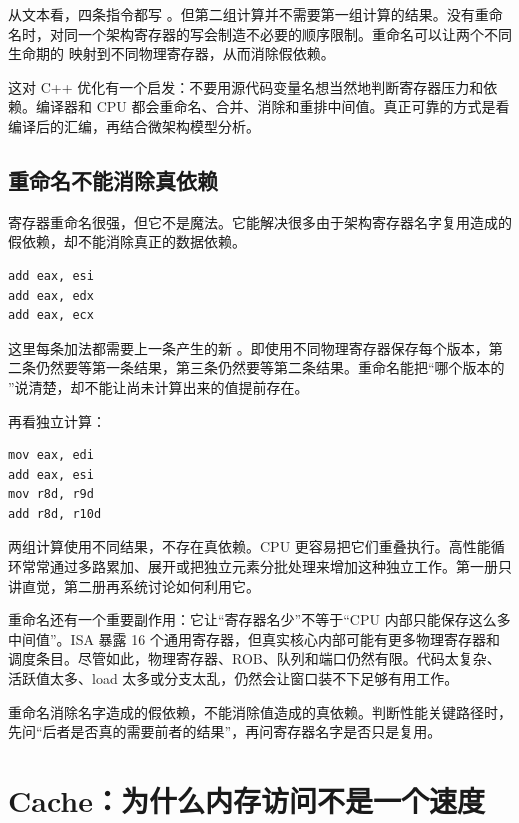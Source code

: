 从文本看，四条指令都写 。但第二组计算并不需要第一组计算的结果。没有重命名时，对同一个架构寄存器的写会制造不必要的顺序限制。重命名可以让两个不同生命期的  映射到不同物理寄存器，从而消除假依赖。

这对 C++ 优化有一个启发：不要用源代码变量名想当然地判断寄存器压力和依赖。编译器和 CPU 都会重命名、合并、消除和重排中间值。真正可靠的方式是看编译后的汇编，再结合微架构模型分析。

\subsection{重命名不能消除真依赖}

寄存器重命名很强，但它不是魔法。它能解决很多由于架构寄存器名字复用造成的假依赖，却不能消除真正的数据依赖。

\begin{lstlisting}
add eax, esi
add eax, edx
add eax, ecx
\end{lstlisting}

这里每条加法都需要上一条产生的新 。即使用不同物理寄存器保存每个版本，第二条仍然要等第一条结果，第三条仍然要等第二条结果。重命名能把“哪个版本的 ”说清楚，却不能让尚未计算出来的值提前存在。

再看独立计算：

\begin{lstlisting}
mov eax, edi
add eax, esi
mov r8d, r9d
add r8d, r10d
\end{lstlisting}

两组计算使用不同结果，不存在真依赖。CPU 更容易把它们重叠执行。高性能循环常常通过多路累加、展开或把独立元素分批处理来增加这种独立工作。第一册只讲直觉，第二册再系统讨论如何利用它。

重命名还有一个重要副作用：它让“寄存器名少”不等于“CPU 内部只能保存这么多中间值”。ISA 暴露 16 个通用寄存器，但真实核心内部可能有更多物理寄存器和调度条目。尽管如此，物理寄存器、ROB、队列和端口仍然有限。代码太复杂、活跃值太多、load 太多或分支太乱，仍然会让窗口装不下足够有用工作。

\begin{keyidea}
重命名消除名字造成的假依赖，不能消除值造成的真依赖。判断性能关键路径时，先问“后者是否真的需要前者的结果”，再问寄存器名字是否只是复用。
\end{keyidea}

\section{Cache：为什么内存访问不是一个速度}

